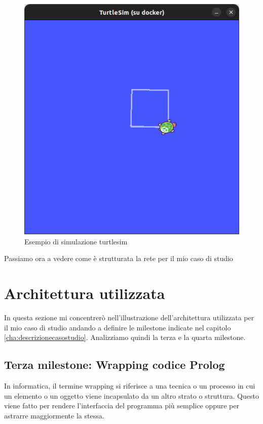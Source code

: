 \begin{figure}[h!]
    \centering
    \includegraphics[scale=0.4]{images/turtlesimes.png}
    \caption{Esempio di simulazione turtlesim}
    \label{fig:turtlesimes}
\end{figure}

Passiamo ora a vedere come è strutturata la rete per il mio caso di studio
\section{Architettura utilizzata}
\label{sec:architettura_utilizzata}
In questa sezione mi concentrerò nell'illustrazione dell'architettura utilizzata per il mio caso di studio andando a definire le milestone indicate nel capitolo \ref{cha:descrizionecasostudio}.
Analizziamo quindi la terza e la quarta milestone.

\subsection{Terza milestone: Wrapping codice Prolog}
\label{subsec:wrappping}
In informatica, il termine wrapping si riferisce a una tecnica o un processo in cui un elemento o un oggetto viene incapsulato da un altro strato o struttura.
Questo viene fatto per rendere l'interfaccia del programma più semplice oppure per astrarre maggiormente la stessa. 

